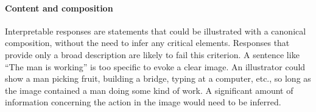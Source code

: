 \documentclass[12pt,notitlepage]{article}
\newcommand{\lk}[1]{\marginpar{\linespread{1}\scriptsize LK: #1}}
\begin{document}

%
%



\paragraph{Content and composition} Interpretable responses are statements that could be illustrated with a canonical composition, without the need to infer any critical elements. Responses that provide only a broad description are likely to fail this criterion. A sentence like ``The man is working'' is too specific to evoke a clear image. An illustrator could show a man picking fruit, building a bridge, typing at a computer, etc., so long as the image contained a man doing some kind of work. A significant amount of information concerning the action in the image would need to be inferred.
\end{document}
